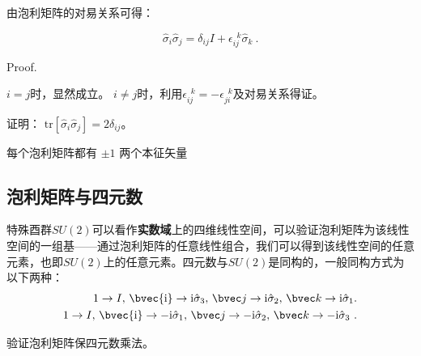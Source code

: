 由泡利矩阵的对易关系可得：
\begin{theorem}{}
\begin{equation}\label{eq_pauliM_1}
\hat{\sigma}_i\hat{\sigma}_j = \delta_{ij}I + \epsilon ^{\,\,\, k}_{ij}\hat{\sigma}_k~.
\end{equation}
\end{theorem}
Proof.

$i=j$时，显然成立。
$i\neq j$时，利用$\epsilon ^{\,\,\, k}_{ij}=-\epsilon ^{\,\,\, k}_{ji}$及对易关系得证。


\begin{exercise}{}
证明：
$\mathrm{tr}[\hat{\sigma}_i \hat{\sigma}_j]= 2\delta_{ij}$。
\end{exercise}

每个泡利矩阵都有 $\pm 1$ 两个本征矢量
\subsection{泡利矩阵与四元数}
特殊酉群$SU(2)$可以看作\textbf{实数域}上的四维线性空间，可以验证泡利矩阵为该线性空间的一组基——通过泡利矩阵的任意线性组合，我们可以得到该线性空间的任意元素，也即$SU(2)$上的任意元素。四元数与$SU(2)$是同构的，一般同构方式为以下两种：
\begin{equation}
\begin{aligned}
1\rightarrow I,\,\bvec{\mathrm i}\rightarrow \mathrm i \hat{\sigma}_3,\,\bvec j\rightarrow \mathrm i\hat{\sigma}_2,\,\bvec k\rightarrow \mathrm i\hat{\sigma}_1.\\
1\rightarrow I,\,\bvec{\mathrm i}\rightarrow -\mathrm i\hat{\sigma}_1,\,\bvec j\rightarrow -\mathrm i\hat{\sigma}_2,\,\bvec k\rightarrow -\mathrm i\hat{\sigma}_3~.
\end{aligned}
\end{equation}

\begin{exercise}{}
验证泡利矩阵保四元数乘法。
\end{exercise}